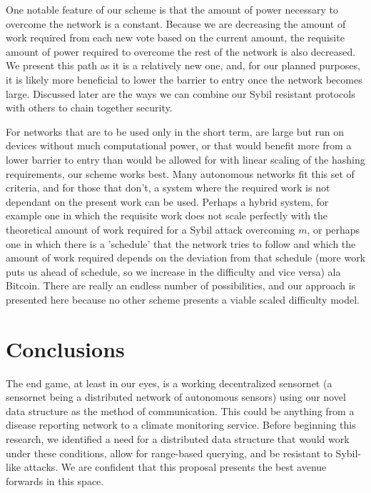 \documentclass[10pt]{IEEEtran}
\begin{document}
\par One notable feature of our scheme is that the amount of power necessary to overcome the network is a constant. Because we are decreasing the amount of work required from each new vote based on the current amount, the requisite amount of power required to overcome the rest of the network is also decreased. We present this path as it is a relatively new one, and, for our planned purposes, it is likely more beneficial to lower the barrier to entry once the network becomes large. Discussed later  are the ways we can combine our Sybil resistant protocols with others to chain together security. 
\par For networks that are to be used only in the short term, are large but run on devices without much computational power, or that would benefit more from a lower barrier to entry than would be allowed for with linear scaling of the hashing requirements, our scheme works best. Many autonomous networks fit this set of criteria, and for those that don't, a system where the required work is not dependant on the present work can be used. Perhaps a hybrid system, for example one in which the requisite work does not scale perfectly with the theoretical amount of work required for a Sybil attack overcoming $m$, or perhaps one in which there is a 'schedule' that the network tries to follow and which the amount of work required depends on the deviation from that schedule (more work puts us ahead of schedule, so we increase in the difficulty and vice versa) ala Bitcoin. There are really an endless number of possibilities, and our approach is presented here because no other scheme presents a viable scaled difficulty model.


\subsection{}
\section{Conclusions}
\par The end game, at least in our eyes, is a working decentralized sensornet (a sensornet being a distributed network of autonomous sensors) using our novel data structure as the method of communication. This could be anything from a disease reporting network to a climate monitoring service. Before beginning this research, we identified a need for a distributed data structure that would work under these conditions, allow for range-based querying, and be resistant to Sybil-like attacks. We are confident that this proposal presents the best avenue forwards in this space.



\printbibliography
\end{document}
